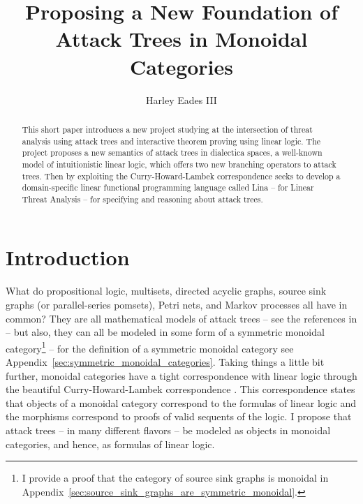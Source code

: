 \documentclass{llncs}
\date{}
\begin{document}
\title{Proposing a New Foundation of Attack Trees in Monoidal Categories}

\author{Harley Eades III}

\maketitle 

\begin{abstract}
  This short paper introduces a new project studying at the
  intersection of threat analysis using attack trees and interactive
  theorem proving using linear logic.  The project proposes a new
  semantics of attack trees in dialectica spaces, a well-known model
  of intuitionistic linear logic, which offers two new branching
  operators to attack trees.  Then by exploiting the
  Curry-Howard-Lambek correspondence seeks to develop a
  domain-specific linear functional programming language called Lina
  -- for Linear Threat Analysis -- for specifying and reasoning about
  attack trees.
\end{abstract}

\section{Introduction}
\label{sec:introduction}

What do propositional logic, multisets, directed acyclic graphs,
source sink graphs (or parallel-series pomsets), Petri nets, and
Markov processes all have in common?  They are all mathematical models
of attack trees -- see the references in
\cite{Kordy:2014a,Jhawar:2015} -- but also, they can all be modeled in
some form of a symmetric monoidal category\footnote{I provide a proof
  that the category of source sink graphs is monoidal in
  Appendix~\ref{sec:source_sink_graphs_are_symmetric_monoidal}.}
\cite{Tzouvaras:1998,Brown:1991,Fiore:2013,FrancescoAlbasini2010} --
for the definition of a symmetric monoidal category see
Appendix~\ref{sec:symmetric_monoidal_categories}.  Taking things a
little bit further, monoidal categories have a tight correspondence
with linear logic through the beautiful Curry-Howard-Lambek
correspondence \cite{MSC:4439568}.  This correspondence states that
objects of a monoidal category correspond to the formulas of linear
logic and the morphisms correspond to proofs of valid sequents of the
logic.  I propose that attack trees -- in many different flavors -- be
modeled as objects in monoidal categories, and hence, as formulas of
linear logic.
\end{document}
